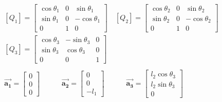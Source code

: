 \documentclass[conference]{IEEEtran}
\begin{document}
\begin{small}
    \begin{align*}
         & \left[Q_1\right] = \begin{bmatrix}
                                  \cos \theta_1 & 0 & \sin \theta_1   \\
                                  \sin \theta_1 & 0 & - \cos \theta_1 \\
                                  0             & 1 & 0
                              \end{bmatrix} \quad
        \left[Q_2\right] = \begin{bmatrix}
                               \cos \theta_2 & 0 & \sin \theta_2   \\
                               \sin \theta_2 & 0 & - \cos \theta_2 \\
                               0             & 1 & 0
                           \end{bmatrix}    \\
         & \left[Q_3\right] = \begin{bmatrix}
                                  \cos \theta_3 & - \sin \theta_3 & 0 \\
                                  \sin \theta_3 & \cos \theta_3   & 0 \\
                                  0             & 0               & 1
                              \end{bmatrix} \\
         &                                        &               \\
         & \vec{\mathbf{a_1}} =
        \begin{bmatrix}
            0 \\
            0 \\
            0
        \end{bmatrix} \quad\quad\quad
        \vec{\mathbf{a_2}} =
        \begin{bmatrix}
            0 \\
            0 \\
            -l_1
        \end{bmatrix} \quad\quad\quad
        \vec{\mathbf{a_3}} =
        \begin{bmatrix}
            l_2 \cos \theta_3 \\
            l_2 \sin \theta_3 \\
            0
        \end{bmatrix}
    \end{align*}
\end{small}
\end{document}
